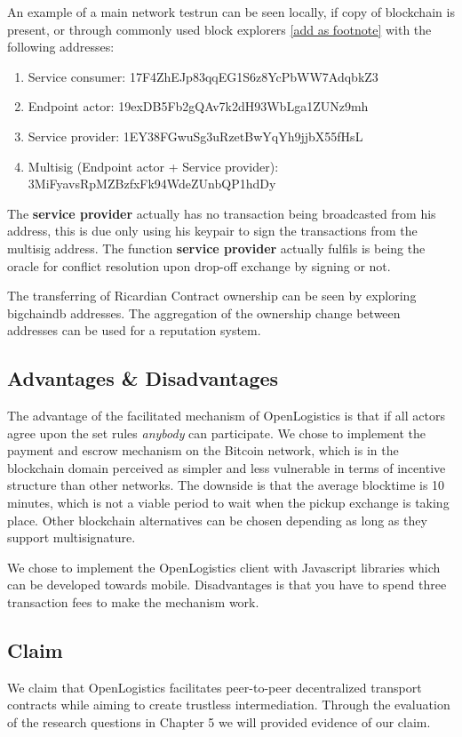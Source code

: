 An example of a main network testrun can be seen locally, if copy of blockchain is present, or through commonly used block explorers \href{https://www.blocktrail.com/BTC}{[add as footnote]}
 with the following addresses:
\begin{enumerate}
  \item Service consumer: 17F4ZhEJp83qqEG1S6z8YcPbWW7AdqbkZ3
  \item Endpoint actor: 19exDB5Fb2gQAv7k2dH93WbLga1ZUNz9mh
  \item Service provider: 1EY38FGwuSg3uRzetBwYqYh9jjbX55fHsL
  \item Multisig (Endpoint actor + Service provider): 3MiFyavsRpMZBzfxFk94WdeZUnbQP1hdDy
\end{enumerate}

The \textbf{service provider} actually has no transaction being broadcasted from his address, this is due only using his keypair to sign the transactions from the multisig address. The function \textbf{service provider} actually fulfils is being the oracle for conflict resolution upon drop-off exchange by signing or not.\par
The transferring of Ricardian Contract ownership can be seen by exploring bigchaindb addresses. The aggregation of the ownership change between addresses can be used for a reputation system.

\subsection{Advantages \& Disadvantages}

The advantage of the facilitated mechanism of OpenLogistics is that if all actors agree upon the set rules \textit{anybody} can participate. We chose to implement the payment and escrow mechanism on the Bitcoin network, which is in the blockchain domain perceived as simpler and less vulnerable in terms of incentive structure than other networks. The downside is that the average blocktime is 10 minutes, which is not a viable period to wait when the pickup exchange is taking place. Other blockchain alternatives can be chosen depending as long as they support multisignature. \par
We chose to implement the OpenLogistics client with Javascript libraries which can be developed towards mobile.
Disadvantages is that you have to spend three transaction fees to make the mechanism work.

\subsection{Claim}

We claim that OpenLogistics facilitates peer-to-peer decentralized transport contracts while aiming to create trustless intermediation. Through the evaluation of the research questions in Chapter 5 we will provided evidence of our claim.

